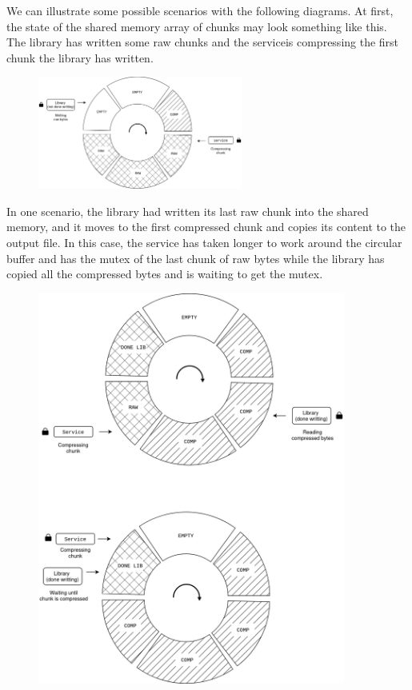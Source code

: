 \documentclass[12pt]{article}
\begin{document}
\par We can illustrate some possible scenarios with the following diagrams. At first, the state of the shared memory array of chunks may look something like this. The library has written some raw chunks and the serviceis compressing the first chunk the library has written.

\begin{figure}[h]
\centering
\includegraphics[width=0.6\textwidth]{AOS-start.png}
\end{figure}
\FloatBarrier

\newpage
\par In one scenario, the library had written its last raw chunk into the shared memory, and it moves to the first compressed chunk and copies its content to the output file. In this case, the service has taken longer to work around the circular buffer and has the mutex of the last chunk of raw bytes while the library has copied all the compressed bytes and is waiting to get the mutex.

\begin{figure}[h]
\centering
\includegraphics[width=0.9\textwidth]{AOS-done.png}
\end{figure}
\FloatBarrier
\end{document}
